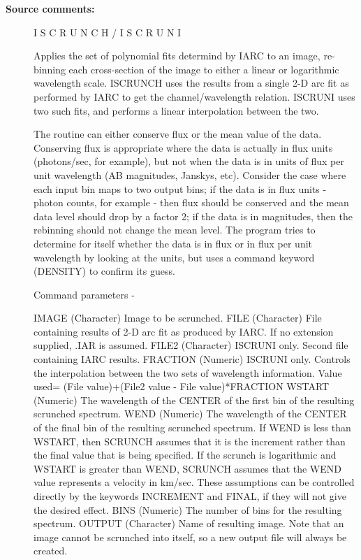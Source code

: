 \begin{description}
\begin{description}
\item [\textbf{Source comments:}]
\begin{terminalv}
 I S C R U N C H      /      I S C R U N I

 Applies the set of polynomial fits determind by IARC to
 an image, re-binning each cross-section of the image to
 either a linear or logarithmic wavelength scale.  ISCRUNCH
 uses the results from a single 2-D arc fit as performed by
 IARC to get the channel/wavelength relation.  ISCRUNI uses
 two such fits, and performs a linear interpolation between
 the two.

 The routine can either conserve flux or the mean value
 of the data.  Conserving flux is appropriate where the data is
 actually in flux units (photons/sec, for example), but not when
 the data is in units of flux per unit wavelength (AB magnitudes,
 Janskys, etc). Consider the case where each input bin maps to two
 output bins; if the data is in flux units - photon counts, for
 example - then flux should be conserved and the mean data level
 should drop by a factor 2; if the data is in magnitudes, then
 the rebinning should not change the mean level.  The program
 tries to determine for itself whether the data is in flux
 or in flux per unit wavelength by looking at the units, but
 uses a command keyword (DENSITY) to confirm its guess.

 Command parameters -

 IMAGE      (Character) Image to be scrunched.
 FILE       (Character) File containing results of 2-D arc fit
            as produced by IARC.  If no extension supplied,
            .IAR is assumed.
 FILE2      (Character) ISCRUNI only. Second file containing
            IARC results.
 FRACTION   (Numeric) ISCRUNI only.  Controls the interpolation
            between the two sets of wavelength information.
            Value used=
                (File value)+(File2 value - File value)*FRACTION
 WSTART     (Numeric) The wavelength of the CENTER of the first
            bin of the resulting scrunched spectrum.
 WEND       (Numeric) The wavelength of the CENTER of the final
            bin of the resulting scrunched spectrum.  If WEND is
            less than WSTART, then SCRUNCH assumes that it is the
            increment rather than the final value that is being
            specified.  If the scrunch is logarithmic and WSTART
            is greater than WEND, SCRUNCH assumes that the WEND
            value represents a velocity in km/sec.  These
            assumptions can be controlled directly by the keywords
            INCREMENT and FINAL, if they will not give the desired
            effect.
 BINS       (Numeric) The number of bins for the resulting spectrum.
 OUTPUT     (Character) Name of resulting image.  Note that an image
            cannot be scrunched into itself, so a new output file
            will always be created.


\end{terminalv}
\end{description}
\end{description}
